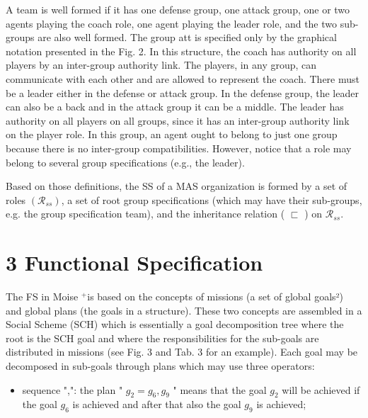 \documentclass[10pt]{article}
\begin{document}
A team is well formed if it has one defense group, one attack group, one or two agents playing the coach role, one agent playing the leader role, and the two sub-groups are also well formed. The group att is specified only by the graphical notation presented in the Fig. 2. In this structure, the coach has authority on all players by an inter-group authority link. The players, in any group, can communicate with each other and are allowed to represent the coach. There must be a leader either in the defense or attack group. In the defense group, the leader can also be a back and in the attack group it can be a middle. The leader has authority on all players on all groups, since it has an inter-group authority link on the player role. In this group, an agent ought to belong to just one group because there is no inter-group compatibilities. However, notice that a role may belong to several group specifications (e.g., the leader).

Based on those definitions, the SS of a MAS organization is formed by a set of roles $\left(\mathcal{R}_{s s}\right)$, a set of root group specifications (which may have their sub-groups, e.g. the group specification team), and the inheritance relation ( $\sqsubset$ ) on $\mathcal{R}_{s s}$.

\section*{3 Functional Specification}
The FS in Moise ${ }^{+}$is based on the concepts of missions (a set of global goals²) and global plans (the goals in a structure). These two concepts are assembled in a Social Scheme (SCH) which is essentially a goal decomposition tree where the root is the SCH goal and where the responsibilities for the sub-goals are distributed in missions (see Fig. 3 and Tab. 3 for an example). Each goal may be decomposed in sub-goals through plans which may use three operators:

\begin{itemize}
  \item sequence ",": the plan " $g_{2}=g_{6}, g_{9}$ " means that the goal $g_{2}$ will be achieved if the goal $g_{6}$ is achieved and after that also the goal $g_{9}$ is achieved;
\end{itemize}
\end{document}
